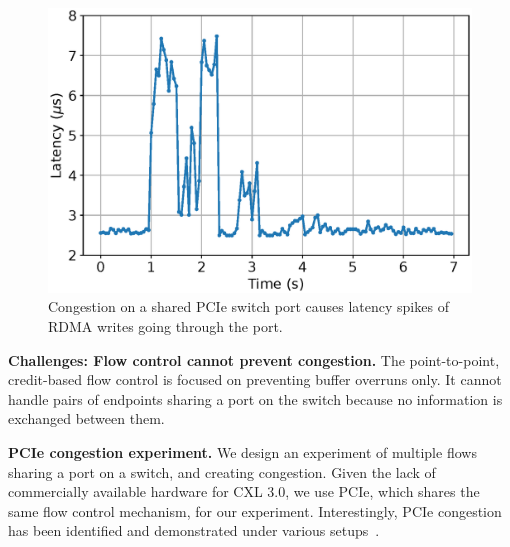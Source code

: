 \begin{figure}[t!]  
    \centering
    \includegraphics[width=0.8\columnwidth]{figure/aurelia/pcie-congestion.eps}  
    \caption{    
    Congestion on a shared PCIe switch port causes latency spikes of RDMA writes going through the port.      
    }
    \label{fig:pcie-congestion}        
\end{figure}

\noindent \textbf{Challenges: Flow control cannot prevent congestion.}
The point-to-point, credit-based flow control is focused on preventing buffer overruns only. 
%
It cannot handle pairs of endpoints sharing a port on the switch because no information is exchanged between them.

\noindent \textbf{PCIe congestion experiment.}
We design an experiment of multiple flows sharing a port on a switch, and creating congestion.
%
Given the lack of commercially available hardware for CXL 3.0, we use PCIe, which shares the same flow control mechanism, for our experiment. 
%
Interestingly, PCIe congestion has been identified and demonstrated under various setups~\cite{sbfc:ieee-micro:2005, pcie-congestion-model:sc:2016, invisible-probe:oaklnad:2021}. 

